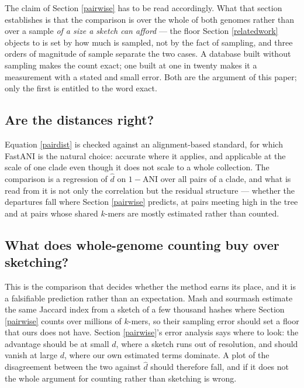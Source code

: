 \documentclass[pdflatex,sn-vancouver-num]{sn-jnl}
\begin{document}
The claim of Section \ref{pairwise} has to be read accordingly. What that section establishes is that
the comparison is over the whole of both genomes rather than over a sample \emph{of a size a sketch
can afford} --- the floor Section \ref{relatedwork} objects to is set by how much is sampled, not by
the fact of sampling, and three orders of magnitude of sample separate the two cases. A database built
without sampling makes the count exact; one built at one in twenty makes it a measurement with a
stated and small error. Both are the argument of this paper; only the first is entitled to the word
exact.

    \subsection{Are the distances right?}

Equation \eqref{pairdist} is checked against an alignment-based standard, for which
FastANI \cite{jain2018fastani} is the natural choice: accurate where it applies, and applicable at
the scale of one clade even though it does not scale to a whole collection. The comparison is a
regression of $\widehat{d}$ on $1 - \mathrm{ANI}$ over all pairs of a clade, and what is read from
it is not only the correlation but the residual structure --- whether the departures fall where
Section \ref{pairwise} predicts, at pairs meeting high in the tree and at pairs whose shared $k$-mers
are mostly estimated rather than counted.

    \subsection{What does whole-genome counting buy over sketching?}

This is the comparison that decides whether the method earns its place, and it is a falsifiable
prediction rather than an expectation. Mash \cite{Ondov:2016aa} and sourmash
\cite{pierce2019sourmash} estimate the same Jaccard index from a sketch of a few thousand hashes
where Section \ref{pairwise} counts over millions of $k$-mers, so their sampling error should set a
floor that ours does not have. Section \ref{pairwise}'s error analysis says where to look: the
advantage should be at small $d$, where a sketch runs out of resolution, and should vanish at large
$d$, where our own estimated terms dominate. A plot of the disagreement between the two against
$\widehat{d}$ should therefore fall, and if it does not the whole argument for counting rather than
sketching is wrong.
\end{document}
